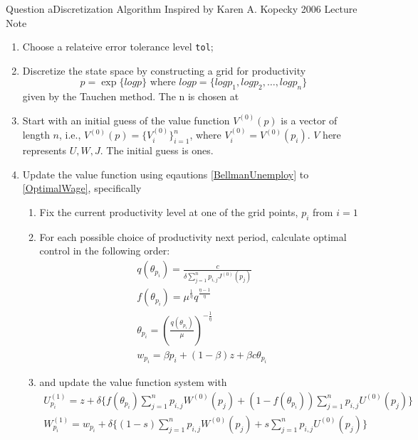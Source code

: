 \documentclass{beamer}
\begin{document}
\begin{frame}[allowframebreaks]{Question a}{Discretization Algorithm}
    Inspired by Karen A. Kopecky 2006 Lecture Note
    \begin{enumerate}
        \item Choose a relateive error tolerance level \texttt{tol};
        \item Discretize the state space by constructing a grid for productivity \[
            p = \exp\{logp\}
            \text{\ where\ } logp = \{logp_1, logp_2, \ldots, logp_n\} \] given by the Tauchen method.
            The n is chosen at %
        \item Start with an initial guess of the value function \(V^{(0)}(p)\) is a vector of length \(n\), i.e., \(V^{(0)}(p) = \{V^{(0)}_i\}_{i=1}^n\), where \(V^{(0)}_i = V^{(0)}(p_i)\).
            \(V\) here represents \(U, W, J\). The initial guess is ones.
        \framebreak
        \label{update}
        \item Update the value function using eqautions \ref{BellmanUnemploy} to \ref{OptimalWage}, specifically
            \begin{enumerate}
                \item Fix the current productivity level at one of the grid points, \(p_i\) from \(i=1\)
                \item For each possible choice of productivity next period, calculate optimal control in the following order:
                \begin{gather*}
                    q(\theta_{p_i}) = \frac{c}{\delta \sum_{j=1}^{n}p_{i,j}J^{(0)}(p_j)}\\
                    f(\theta_{p_i}) = \mu^\frac{1}{\eta} q^\frac{\eta-1}{\eta}\\
                    \theta_{p_i} = (\frac{q(\theta_{p_i})}{\mu})^{-\frac{1}{\eta}}\\
                    w_{p_i} = \beta p_i + (1-\beta)z + \beta c \theta_{p_i}
                \end{gather*}
                \item and update the value function system with 
                \framebreak
                \begin{gather*}
                    U^{(1)}_{p_i} = z + \delta\{f(\theta_{p_i})\sum_{j=1}^{n}p_{i,j}W^{(0)}(p_j) + (1-f(\theta_{p_i}))\sum_{j=1}^{n}p_{i,j}U^{(0)}(p_j)\}\\
                    W^{(1)}_{p_i} = w_{p_i} + \delta\{(1-s)\sum_{j=1}^{n}p_{i,j}W^{(0)}(p_j) + s\sum_{j=1}^{n}p_{i,j}U^{(0)}(p_j)\}\\

\end{gather*}
\end{enumerate}
\end{enumerate}
\end{frame}
\end{document}
